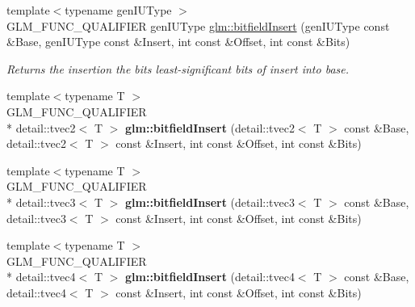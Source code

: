 \begin{DoxyCompactItemize}
\item 
{\footnotesize template$<$typename gen\-I\-U\-Type $>$ }\\G\-L\-M\-\_\-\-F\-U\-N\-C\-\_\-\-Q\-U\-A\-L\-I\-F\-I\-E\-R gen\-I\-U\-Type \hyperlink{group__core__func__integer_ga490b328e7b5d06b477ede4a59edfb798}{glm\-::bitfield\-Insert} (gen\-I\-U\-Type const \&Base, gen\-I\-U\-Type const \&Insert, int const \&Offset, int const \&Bits)
\begin{DoxyCompactList}\small\item\em Returns the insertion the bits least-\/significant bits of insert into base. \end{DoxyCompactList}\item 
\hypertarget{namespaceglm_a13eb4b03e07aff8b95d59079ba5790e3}{{\footnotesize template$<$typename T $>$ }\\G\-L\-M\-\_\-\-F\-U\-N\-C\-\_\-\-Q\-U\-A\-L\-I\-F\-I\-E\-R \\*
detail\-::tvec2$<$ T $>$ {\bfseries glm\-::bitfield\-Insert} (detail\-::tvec2$<$ T $>$ const \&Base, detail\-::tvec2$<$ T $>$ const \&Insert, int const \&Offset, int const \&Bits)}\label{namespaceglm_a13eb4b03e07aff8b95d59079ba5790e3}

\item 
\hypertarget{namespaceglm_ac46b5eb28b597fb612dd0cc982bc97de}{{\footnotesize template$<$typename T $>$ }\\G\-L\-M\-\_\-\-F\-U\-N\-C\-\_\-\-Q\-U\-A\-L\-I\-F\-I\-E\-R \\*
detail\-::tvec3$<$ T $>$ {\bfseries glm\-::bitfield\-Insert} (detail\-::tvec3$<$ T $>$ const \&Base, detail\-::tvec3$<$ T $>$ const \&Insert, int const \&Offset, int const \&Bits)}\label{namespaceglm_ac46b5eb28b597fb612dd0cc982bc97de}

\item 
\hypertarget{namespaceglm_a84dd7fb4a6325934c77f005416b56eb8}{{\footnotesize template$<$typename T $>$ }\\G\-L\-M\-\_\-\-F\-U\-N\-C\-\_\-\-Q\-U\-A\-L\-I\-F\-I\-E\-R \\*
detail\-::tvec4$<$ T $>$ {\bfseries glm\-::bitfield\-Insert} (detail\-::tvec4$<$ T $>$ const \&Base, detail\-::tvec4$<$ T $>$ const \&Insert, int const \&Offset, int const \&Bits)}\label{namespaceglm_a84dd7fb4a6325934c77f005416b56eb8}


\end{DoxyCompactItemize}
